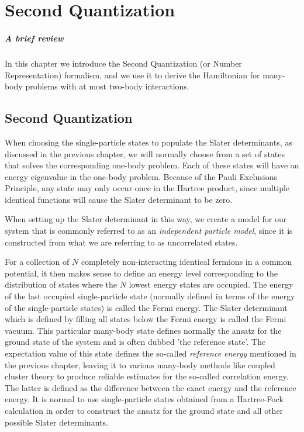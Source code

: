 
\chapter{Second Quantization} %

\label{Chapter2} %


\paragraph{A brief review} In this chapter we introduce the Second Quantization (or Number Representation) formalism, and we use it to derive the Hamiltonian for many-body problems with at most two-body interactions.

\section{Second Quantization}

When choosing the single-particle states to populate the Slater
determinants, as discussed in the previous chapter, we will
normally choose from a set of states that solves the corresponding one-body problem. 
Each of these states will have an energy eigenvalue in
the one-body problem. Because of the Pauli Exclusions Principle, any
state may only occur once in the Hartree product, since multiple
identical functions will cause the Slater determinant to be zero.

When setting up the Slater determinant in this way, we create a model for our system
that is commonly referred to as an \emph{independent particle model},
since it is constructed from what we are referring to as uncorrelated states.

For a collection of $N$ completely non-interacting identical fermions
in a common potential, it then makes sense to define an energy level
corresponding to the distribution of states where the $N$ lowest
energy states are occupied. The energy of the last occupied
single-particle state (normally defined in terms of the energy of the
single-particle states) is called the Fermi energy. The Slater
determinant which is defined by filling all states below the Fermi
energy is called the Fermi vacuum. This particular many-body state
defines normally the ansatz for the ground state of the system and is
often dubbed 'the reference state'.  The expectation value of this state defines the so-called \emph{reference energy} mentioned in the previous chapter,
leaving it to various many-body methods like coupled cluster theory to produce reliable estimates for the 
so-called correlation energy. The latter is defined as the difference between the exact energy and the reference energy.
It is normal to use single-particle states obtained from a Hartree-Fock calculation in order to construct the 
ansatz for the ground state and all other possible Slater determinants. 

